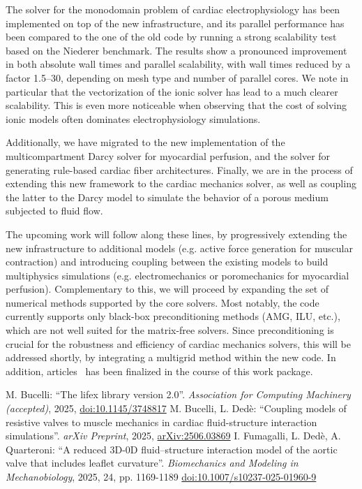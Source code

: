 \documentclass[a4paper,12pt, numbers]{article}
\begin{document}
The solver for the monodomain problem of cardiac electrophysiology has been implemented on top of the new infrastructure, and its parallel performance has been compared to the one of the old code by running a strong scalability test based on the Niederer benchmark. The results show a pronounced improvement in both absolute wall times and parallel scalability, with wall times reduced by a factor 1.5--30, depending on mesh type and number of parallel cores. We note in particular that the vectorization of the ionic solver has lead to a much clearer scalability. This is even more noticeable when observing that the cost of solving ionic models often dominates electrophysiology simulations.

Additionally, we have migrated to the new implementation of the multicompartment Darcy solver for myocardial perfusion, and the solver for generating rule-based cardiac fiber architectures. Finally, we are in the process of extending this new framework to the cardiac mechanics solver, as well as coupling the latter to the Darcy model to simulate the behavior of a porous medium subjected to fluid flow.

The upcoming work will follow along these lines, by progressively extending the new infrastructure to additional models (e.g. active force generation for muscular contraction) and introducing coupling between the existing models to build multiphysics simulations (e.g. electromechanics or poromechanics for myocardial perfusion). Complementary to this, we will proceed by expanding the set of numerical methods supported by the core solvers. Most notably, the code currently supports only black-box preconditioning methods (AMG, ILU, etc.), which are not well suited for the matrix-free solvers. Since preconditioning is crucial for the robustness and efficiency of cardiac mechanics solvers, this will be addressed shortly, by integrating a multigrid method within the new code. In addition, articles~\cite{bucelli2025, fumagalli2025} has been finalized in the course of this work package.

\begin{thebibliography}{10}
	 M. Bucelli: ``The lifex library version 2.0''. \emph{Association for Computing Machinery (accepted)}, 2025, \href{https://doi.org/10.1145/3748817}{doi:10.1145/3748817}
	 M. Bucelli, L. Ded\`e: ``Coupling models of resistive valves to muscle mechanics in cardiac fluid-structure interaction simulations''. \emph{arXiv Preprint}, 2025, \href{https://https://arxiv.org/abs/2506.03869}{arXiv:2506.03869}
	 I. Fumagalli, L. Ded\`e, A. Quarteroni: ``A reduced 3D-0D fluid–structure interaction model of the aortic valve that includes leaflet curvature''. \emph{Biomechanics and Modeling in Mechanobiology}, 2025, 24, pp. 1169-1189 \href{https://doi.org/10.1007/s10237-025-01960-9}{doi:10.1007/s10237-025-01960-9}
\end{thebibliography}
\end{document}
